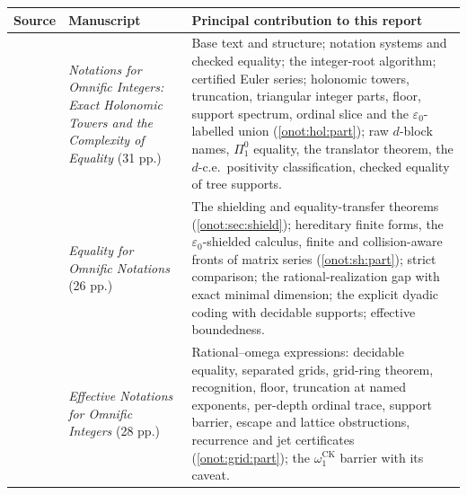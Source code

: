 \documentclass[11pt,oneside]{article}
\numberwithin{equation}{section}
\theoremstyle{definition}
\theoremstyle{remark}
\newcommand{\CK}{\omega_1^{\mathrm{CK}}}
\begin{document}
\begin{center}
\renewcommand{\arraystretch}{1.2}
\begin{tabular}{>{\raggedright\arraybackslash}p{}>{\raggedright\arraybackslash}p{}>{\raggedright\arraybackslash}p{}}
\toprule
Source & Manuscript & Principal contribution to this report\\
\midrule
08 & \emph{Notations for Omnific Integers: Exact Holonomic Towers and the
Complexity of Equality} (31 pp.) & Base text and structure; notation systems and
checked equality; the integer-root algorithm; certified Euler series; holonomic
towers, truncation, triangular integer parts, floor, support spectrum, ordinal
slice and the $\varepsilon_0$-labelled union (\cref{onot:hol:part}); raw
$d$-block names, $\Pi^0_1$ equality, the translator theorem, the $d$-c.e.\
positivity classification, checked equality of tree supports.\\
05 & \emph{Equality for Omnific Notations} (26 pp.) & The shielding and
equality-transfer theorems (\cref{onot:sec:shield}); hereditary finite forms, the
$\varepsilon_0$-shielded calculus, finite and collision-aware fronts of matrix
series (\cref{onot:sh:part}); strict comparison; the rational-realization gap
with exact minimal dimension; the explicit dyadic coding with decidable
supports; effective boundedness.\\
09 & \emph{Effective Notations for Omnific Integers} (28 pp.) &
Rational--omega expressions: decidable equality, separated grids, grid-ring
theorem, recognition, floor, truncation at named exponents, per-depth ordinal
trace, support barrier, escape and lattice obstructions, recurrence and jet
certificates (\cref{onot:grid:part}); the $\CK$ barrier with its caveat.\\
\bottomrule
\end{tabular}
\end{center}
\end{document}
